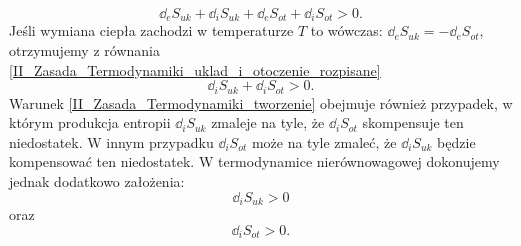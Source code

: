 \documentclass[10pt, a4paper, twoside, onecolumn]{article}
\numberwithin{equation}{section}
\begin{document}
	\begin{equation}\label{II_Zasada_Termodynamiki_uklad_i_otoczenie_rozpisane}
		\dd_{e}S_{uk}+\dd_{i}S_{uk}+\dd_{e}S_{ot}+\dd_{i}S_{ot}>0.
	\end{equation}
	Jeśli wymiana ciepła zachodzi w temperaturze \(T\) to wówczas: \(\dd_{e}S_{uk}=-\dd_{e}S_{ot}\), otrzymujemy z równania \eqref{II_Zasada_Termodynamiki_uklad_i_otoczenie_rozpisane} 
	\begin{equation}\label{II_Zasada_Termodynamiki_tworzenie}
		\dd_{i}S_{uk}+\dd_{i}S_{ot}>0.
	\end{equation}
	Warunek \eqref{II_Zasada_Termodynamiki_tworzenie} obejmuje również przypadek, w którym produkcja entropii \(\dd_{i}S_{uk}\) zmaleje na tyle, że \(\dd_{i}S_{ot}\) skompensuje ten niedostatek. W innym przypadku \(\dd_{i}S_{ot}\) może na tyle zmaleć, że \(\dd_{i}S_{uk}\) będzie kompensować ten niedostatek. W termodynamice nierównowagowej dokonujemy jednak dodatkowo założenia:
	\begin{equation*}
		\dd_{i}S_{uk}>0
	\end{equation*}
	oraz
	\begin{equation*}
		\dd_{i}S_{ot}>0.
	\end{equation*}
	
\end{document}
